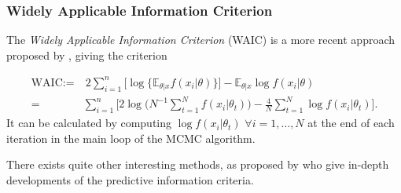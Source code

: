 \subsubsection*{Widely Applicable Information Criterion}

The \emph{Widely Applicable Information Criterion} (WAIC) is a more recent approach proposed by \citet{Watanabe_asymptotic_2010}, giving the criterion  


\begin{equation}
\begin{aligned}
\text{WAIC}:= & \ 2 \sum_{i=1}^n\Big[\log\big\{\mathbb{E}_{\theta|x}f(x_i|\theta)\big\}\Big]- \mathbb{E}_{\theta|x}\log f(x_i|\theta) \\
= &\sum_{i=1}^n\Bigg[2\log \bigg(N^{-1}\sum_{t=1}^N f(x_i|\theta_t)\bigg)-\frac{4}{N}\sum_{t=1}^N\log f(x_i|\theta_t)\Bigg].
\end{aligned}
\end{equation}
It can be calculated by computing $\log f(x_i|\theta_t)$ $\forall i=1,\ldots,N$ at the end of each iteration in the main loop of the MCMC algorithm.

There exists quite other interesting methods, as proposed by \citet{gelman_understanding_2014} who give in-depth developments of the predictive information criteria.

 




